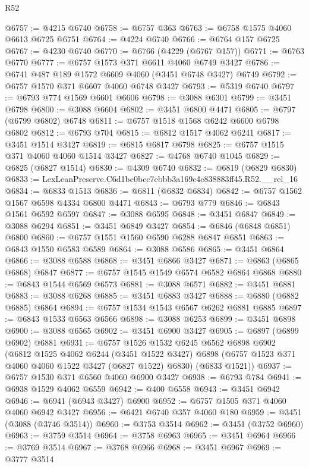 \begin{lexlean}{R52}
\begin{coremodule}
@6757 := @4215 @6740
@6758 := @6757 @363
@6763 := @6758 @1575 @4060 @6613 @6725 @6751
@6764 := @4224 @6740
@6766 := @6764 @157 @6725
@6767 := @4230 @6740
@6770 := @6766 (@4229 (@6767 @157))
@6771 := @6763 @6770
@6777 := @6757 @1573 @371 @6611 @4060 @6749 @3427
@6786 := @6741 @487 @189 @1572 @6609 @4060 (@3451 @6748 @3427) @6749
@6792 := @6757 @1570 @371 @6607 @4060 @6748 @3427
@6793 := @5319 @6740
@6797 := @6793 @774 @1569 @6601 @6606
@6798 := @3088 @6301
@6799 := @3451 @6798
@6800 := @3088 @6604
@6802 := @3451 @6800 @4471
@6805 := @6797 (@6799 @6802) @6748
@6811 := @6757 @1518 @1568 @6242 @6600 @6798 @6802
@6812 := @6793 @704
@6815 := @6812 @1517 @4062 @6241
@6817 := @3451 @1514 @3427
@6819 := @6815 @6817 @6798
@6825 := @6757 @1515 @371 @4060 @4060 @1514 @3427
@6827 := @4768 @6740 @1045
@6829 := @6825 (@6827 @1514)
@6830 := @4309 @6740
@6832 := @6819 (@6829 @6830)
@6833 := LexLeanPreserve.C6d1bc0bcc7cbbb3a169c4e838883ff45.R52.__rel_16
@6834 := @6833 @1513
@6836 := @6811 (@6832 @6834)
@6842 := @6757 @1562 @1567 @6598 @4334 @6800 @4471
@6843 := @6793 @779
@6846 := @6843 @1561 @6592 @6597
@6847 := @3088 @6595
@6848 := @3451 @6847
@6849 := @3088 @6294
@6851 := @3451 @6849 @3427
@6854 := @6846 (@6848 @6851) @6800
@6860 := @6757 @1551 @1560 @6590 @6288 @6847 @6851
@6863 := @6843 @1550 @6583 @6589
@6864 := @3088 @6586
@6865 := @3451 @6864
@6866 := @3088 @6588
@6868 := @3451 @6866 @3427
@6871 := @6863 (@6865 @6868) @6847
@6877 := @6757 @1545 @1549 @6574 @6582 @6864 @6868
@6880 := @6843 @1544 @6569 @6573
@6881 := @3088 @6571
@6882 := @3451 @6881
@6883 := @3088 @6268
@6885 := @3451 @6883 @3427
@6888 := @6880 (@6882 @6885) @6864
@6894 := @6757 @1534 @1543 @6567 @6262 @6881 @6885
@6897 := @6843 @1533 @6563 @6566
@6898 := @3088 @6253
@6899 := @3451 @6898
@6900 := @3088 @6565
@6902 := @3451 @6900 @3427
@6905 := @6897 (@6899 @6902) @6881
@6931 := @6757
    @1526
    @1532
    @6245
    @6562
    @6898
    @6902
    (@6812
      @1525
      @4062
      @6244
      (@3451 @1522 @3427)
      @6898
      (@6757 @1523 @371 @4060 @4060 @1522 @3427 (@6827 @1522) @6830)
      (@6833 @1521))
@6937 := @6757 @1530 @371 @6560 @4060 @6900 @3427
@6938 := @6793 @784
@6941 := @6938 @1529 @4062 @6559
@6942 := @400 @6558
@6943 := @3451 @6942
@6946 := @6941 (@6943 @3427) @6900
@6952 := @6757 @1505 @371 @4060 @4060 @6942 @3427
@6956 := @6421 @6740 @357 @4060 @180
@6959 := @3451 (@3088 (@3746 @3514))
@6960 := @3753 @3514
@6962 := @3451 (@3752 @6960)
@6963 := @3759 @3514
@6964 := @3758 @6963
@6965 := @3451 @6964
@6966 := @3769 @3514
@6967 := @3768 @6966
@6968 := @3451 @6967
@6969 := @3777 @3514

\end{coremodule}
\end{lexlean}
